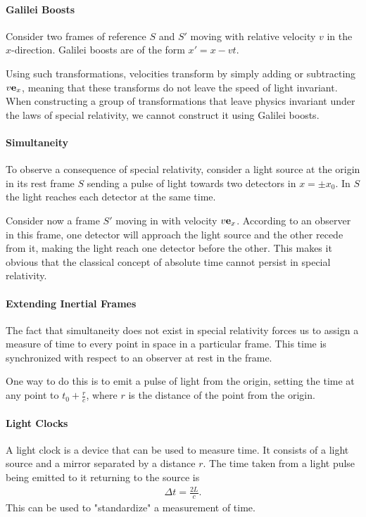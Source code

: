\paragraph{Galilei Boosts}
Consider two frames of reference $S$ and $S'$ moving with relative velocity $v$ in the $x$-direction. Galilei boosts are of the form $x' = x - vt$.

Using such transformations, velocities transform by simply adding or subtracting $v\vb{e}_{x}$, meaning that these transforms do not leave the speed of light invariant. When constructing a group of transformations that leave physics invariant under the laws of special relativity, we cannot construct it using Galilei boosts.

\paragraph{Simultaneity}
To observe a consequence of special relativity, consider a light source at the origin in its rest frame $S$ sending a pulse of light towards two detectors in $x = \pm x_{0}$. In $S$ the light reaches each detector at the same time.

Consider now a frame $S'$ moving in with velocity $v\vb{e}_{x}$. According to an observer in this frame, one detector will approach the light source and the other recede from it, making the light reach one detector before the other. This makes it obvious that the classical concept of absolute time cannot persist in special relativity.

\paragraph{Extending Inertial Frames}
The fact that simultaneity does not exist in special relativity forces us to assign a measure of time to every point in space in a particular frame. This time is synchronized with respect to an observer at rest in the frame.

One way to do this is to emit a pulse of light from the origin, setting the time at any point to $t_{0} + \frac{r}{c}$, where $r$ is the distance of the point from the origin.

\paragraph{Light Clocks}
A light clock is a device that can be used to measure time. It consists of a light source and a mirror separated by a distance $r$. The time taken from a light pulse being emitted to it returning to the source is
\begin{align*}
	\Delta t = \frac{2L}{c}.
\end{align*}
This can be used to "standardize" a measurement of time.

